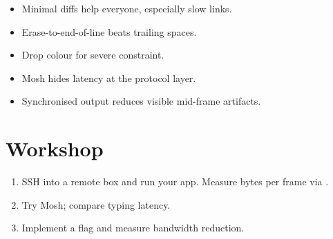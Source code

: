 \begin{recap}
\begin{itemize}[leftmargin=*]
  \item Minimal diffs help everyone, especially slow links.
  \item Erase-to-end-of-line beats trailing spaces.
  \item Drop colour for severe constraint.
  \item Mosh hides latency at the protocol layer.
  \item Synchronised output reduces visible mid-frame
    artifacts.
\end{itemize}
\end{recap}

\section*{Workshop}

\begin{enumerate}[leftmargin=*]
  \item SSH into a remote box and run your app. Measure
    bytes per frame via .
  \item Try Mosh; compare typing latency.
  \item Implement a  flag and measure bandwidth
    reduction.
\end{enumerate}
